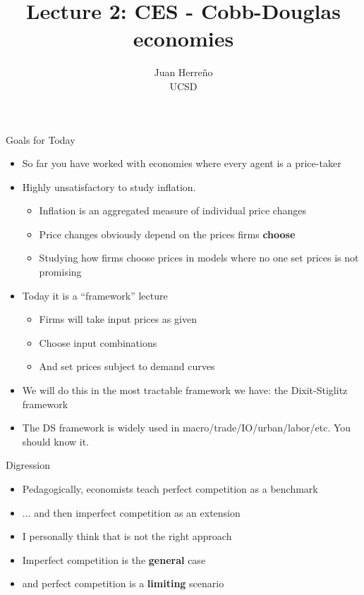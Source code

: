 \documentclass[11pt,aspectratio=169,xcolor={dvipsnames},hyperref={pdftex,pdfpagemode=UseNone,hidelinks,pdfdisplaydoctitle=true},usepdftitle=false]{beamer}
\title{Lecture 2: CES - Cobb-Douglas economies}
\author{Juan Herre\~{n}o\\UCSD}
\begin{document}
\maketitle

\begin{frame}{Goals for Today}
\begin{itemize}
\item So far you have worked with economies where every agent is a price-taker
\item Highly unsatisfactory to study inflation.
\begin{itemize}
\item Inflation is an aggregated measure of individual price changes
\item Price changes obviously depend on the prices firms \textbf{choose}
\item Studying how firms choose prices in models where no one set prices is not promising
\end{itemize}
\item Today it is a ``framework'' lecture
\begin{itemize}
\item Firms will take input prices as given
\item Choose input combinations
\item And set prices subject to demand curves
\end{itemize}
\item We will do this in the most tractable framework we have: the Dixit-Stiglitz framework
\item The DS framework is widely used in macro/trade/IO/urban/labor/etc. You should know it.
\end{itemize}
\end{frame}


\begin{frame}{Digression}
\begin{itemize}
\item Pedagogically, economists teach perfect competition as a benchmark
\item ... and then imperfect competition as an extension
\item I personally think that is not the right approach
\item Imperfect competition is the \textbf{general} case
\item and perfect competition is a \textbf{limiting} scenario
\end{itemize}
\end{frame}
\end{document}
